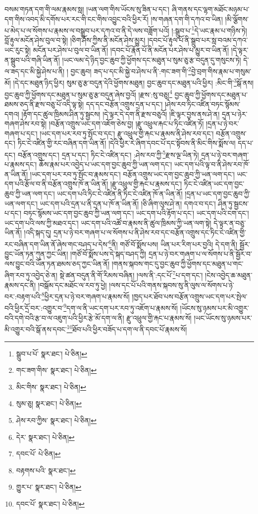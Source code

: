 བསམ་གཏན་དག་གི་ལམ་རྣམས་སླ། །ཡན་ལག་གིས་ཡོངས་སུ་ཟིན་པ་དང་། ཞི་གནས་དང་ལྷག་མཐོང་མཉམ་པ་དག་གིས་འབད་མི་དགོས་པར་རང་གི་ངང་གིས་འབྱུང་བའི་ཕྱིར་རོ། །ས་གཞན་དག་གི་དཀའ་བ་ཡིན། །མི་ལྕོགས་པ་མེད་པ་ལ་སོགས་པ་རྣམས་ལ་བསྒྲུབ་པར་དཀའ་བ་ནི་དེ་ལས་བཟློག་པའོ། །:སྒྲུབ་པ་\footnote{སྒྲུབ་པ་པོ་  སྣར་ཐང་།  པེ་ཅིན། }དེ་ཡང་རྣམ་པ་གཉིས་ཏེ། བློ་རྟུལ་མངོན་ཤེས་བུལ་བ་སྟེ། །ཅིག་ཤོས་ཀྱིས་ནི་མངོན་ཤེས་མྱུར། །དབང་པོ་རྟུལ་པོ་ནི་སྒྲུབ་པར་སླ་བའམ་དཀའ་ཡང་རུང་སྟེ། མངོན་པར་ཤེས་པ་བུལ་བ་ཡིན་ནོ། །དབང་པོ་རྣོན་པོ་ནི་མངོན་པར་ཤེས་པ་མྱུར་བ་ཡིན་ནོ། །དེ་ལྟར་ན་སྒྲུབ་པའི་གཞི་ཡིན་ནོ། །ཡང་ལམ་དེ་ཉིད་བྱང་ཆུབ་ཀྱི་ཕྱོགས་དང་མཐུན་པ་སུམ་ཅུ་རྩ་བདུན་དུ་གསུངས་ཏེ། དེ་ལ་ཟད་དང་མི་སྐྱེ་ཤེས་པ་ནི། །
བྱང་ཆུབ། ཟད་པ་དང་མི་སྐྱེ་བ་ཤེས་པ་ནི་:གང་ཟག་གི་\footnote{གང་ཟག་གིས་  སྣར་ཐང་།  པེ་ཅིན། }བྱེ་བྲག་གིས་རྣམ་པ་གསུམ་མོ། །དེ་དང་མཐུན་ཉིད་ཕྱིར། སུམ་ཅུ་རྩ་བདུན་དེའི་ཕྱོགས་མཐུན། བྱང་ཆུབ་དང་མཐུན་པའི་ཕྱིར། :མིང་གི་\footnote{མིང་གིས་  སྣར་ཐང་།  པེ་ཅིན། }སྒོ་ནས། བྱང་ཆུབ་ཀྱི་ཕྱོགས་དང་མཐུན་པ་སུམ་ཅུ་རྩ་བདུན་ཞེས་བྱའོ། །རྫས་:སུ་བཅུ།\footnote{སུམ་ཅུ།  སྣར་ཐང་།  པེ་ཅིན། } བྱང་ཆུབ་ཀྱི་ཕྱོགས་དང་མཐུན་པ་ཐམས་ཅད་ནི་རྫས་བཅུ་པོ་འདི་ལྟ་སྟེ། དད་དང་བརྩོན་འགྲུས་དྲན་པ་དང་། །ཤེས་རབ་ཏིང་འཛིན་བཏང་སྙོམས་དགའ། །རྟོག་དང་ཚུལ་ཁྲིམས་ཤིན་ཏུ་སྦྱངས། །དེ་ལྟར་དེ་དག་ནི་རྫས་བཅུའོ། །ཇི་ལྟར་བྱས་ནས་ཤེ་ན། དྲན་པ་ཉེར་གཞག་ཤེས་རབ་སྟེ། །བརྩོན་འགྲུས་ཡང་དག་འཇོག་ཅེས་བྱ། །རྫུ་འཕྲུལ་རྐང་པ་ཏིང་འཛིན་ཏོ། །དྲན་པ་ཉེ་བར་གཞག་པ་དང་། །ཡང་དག་པར་རབ་ཏུ་སྤོང་བ་དང་། རྫུ་འཕྲུལ་གྱི་རྐང་པ་རྣམས་ནི་ཤེས་རབ་དང་། བརྩོན་འགྲུས་དང་། ཏིང་ངེ་འཛིན་གྱི་རང་བཞིན་དག་ཡིན་ནོ། །དེའི་ཕྱིར་རེ་ཞིག་དབང་པོ་དང་སྟོབས་ནི་མིང་གིས་སྨོས་ལ། དད་པ་དང་། བརྩོན་འགྲུས་དང་། དྲན་པ་དང་། ཏིང་ངེ་འཛིན་དང་། :ཤེས་རབ་ཀྱི་\footnote{ཤེས་རབ་ཀྱིས་  སྣར་ཐང་།  པེ་ཅིན། }རྫས་ལྔ་ཡིན་ཏེ། དྲན་པ་ཉེ་བར་གཞག་པ་རྣམས་དང་། ཆོས་རྣམ་པར་འབྱེད་པ་ཡང་དག་བྱང་ཆུབ་ཀྱི་ཡན་ལག་དང་། ཡང་དག་པའི་ལྟ་བ་ནི་ཤེས་རབ་ཁོ་ན་ཡིན་ནོ། །ཡང་དག་པར་རབ་ཏུ་སྤོང་བ་རྣམས་དང་། བརྩོན་འགྲུས་ཡང་དག་བྱང་ཆུབ་ཀྱི་ཡན་ལག་དང་། ཡང་དག་པའི་རྩོལ་བ་ནི་བརྩོན་འགྲུས་ཁོ་ན་ཡིན་ནོ། །རྫུ་འཕྲུལ་གྱི་རྐང་པ་རྣམས་དང་། ཏིང་ངེ་འཛིན་ཡང་དག་བྱང་ཆུབ་ཀྱི་ཡན་ལག་དང་། ཡང་དག་པའི་ཏིང་ངེ་འཛིན་ནི་ཏིང་ངེ་འཛིན་ཁོ་ན་ཡིན་ནོ། །དྲན་པ་ཡང་དག་བྱང་ཆུབ་ཀྱི་ཡན་ལག་དང་། ཡང་དག་པའི་དྲན་པ་ནི་དྲན་པ་ཁོ་ན་ཡིན་ནོ། །ཅི་ཞིག་ལུས་ཤེ་ན། དགའ་བ་དང་། ཤིན་ཏུ་སྦྱངས་པ་དང་། བཏང་སྙོམས་ཡང་དག་བྱང་ཆུབ་ཀྱི་ཡན་ལག་དང་། ཡང་དག་པའི་རྟོག་པ་དང་། ཡང་དག་པའི་ངག་དང་། ཡང་དག་པའི་ལས་ཀྱི་མཐའ་དང་། ཡང་དག་པའི་འཚོ་བ་རྣམས་ནི་ཚུལ་ཁྲིམས་ཀྱི་ཡན་ལག་སྟེ། དེ་ལྟར་ན་བཅུ་ཡིན་ནོ། །འདི་སྐད་དུ། དྲན་པ་ཉེ་བར་གཞག་པ་ལ་སོགས་པ་ནི་ཤེས་རབ་དང་བརྩོན་འགྲུས་དང་ཏིང་ངེ་འཛིན་གྱི་རང་བཞིན་དག་ཡིན་ནོ་ཞེས་གང་བཤད་པ་དེས་\footnote{དེར་  སྣར་ཐང་།  པེ་ཅིན། }ནི། གཙོ་བོ་སྨོས་པས། ཡིན་པར་རིག་པར་བྱའི། དེ་དག་ནི། སྦྱོར་བྱུང་ཡོན་ཏན་ཀུན་ཀྱང་ཡིན། །གཙོ་བོ་སྨོས་པས་དེ་སྐད་བཤད་ཀྱི། དྲན་པ་ཉེ་བར་གཞག་པ་ལ་སོགས་པ་ནི་སྦྱོར་བ་ལས་བྱུང་བའི་ཡོན་ཏན་ཐམས་ཅད་ཀྱང་ཡིན་ནོ། །གནས་སྐབས་གང་དུ་བྱང་ཆུབ་ཀྱི་ཕྱོགས་དང་མཐུན་པ་གང་ཞིག་རབ་ཏུ་འབྱེད་ཅེ་ན། སྡེ་ཚན་བདུན་ནི་གོ་རིམས་བཞིན། །ལས་ནི་:དང་པོ་\footnote{དབང་པོ་  པེ་ཅིན། }པ་དག་དང་། །ངེས་འབྱེད་ཆ་མཐུན་རྣམས་དང་ནི། །བསྒོམ་དང་མཐོང་ལ་རབ་ཏུ་ཕྱེ། །ལས་དང་པོ་པའི་གནས་སྐབས་སུ་ནི་ལུས་ལ་སོགས་པ་ཉེ་བར་:བརྟག་པའི་\footnote{བརྟགས་པའི་  སྣར་ཐང་། }ཕྱིར་དྲན་པ་ཉེ་བར་གཞག་པ་རྣམས་སོ། །ཁྱད་པར་ཐོབ་པས་བརྩོན་འགྲུས་ཡང་དག་པར་སྤེལ་བའི་ཕྱིར་དྲོ་བར་:འགྱུར་བ་\footnote{གྱུར་པ་  སྣར་ཐང་།  པེ་ཅིན། }དག་ལ་ནི་ཡང་དག་པར་རབ་ཏུ་འཇོག་པ་རྣམས་སོ། །ཡོངས་སུ་ཉམས་པར་མི་འགྱུར་བའི་དགེ་བའི་རྩ་བ་ལ་འཇུག་པའི་ཕྱིར་རྩེ་མོ་དག་ལ་ནི། རྫུ་འཕྲུལ་གྱི་རྐང་པ་རྣམས་སོ། །ཡང་ཡོངས་སུ་ཉམས་པར་མི་འགྱུར་བའི་སྒོ་ནས་དབང་\footnote{དབང་པོ་  སྣར་ཐང་།  པེ་ཅིན། }ཐོབ་པའི་ཕྱིར་བཟོད་པ་དག་ལ་ནི་དབང་པོ་རྣམས་སོ། 